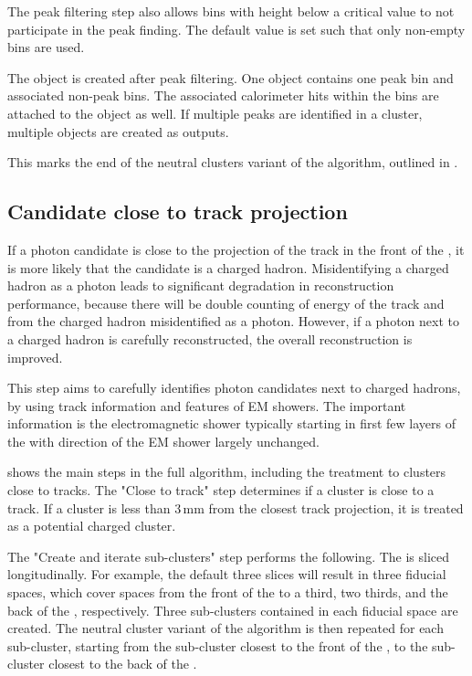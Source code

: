 The peak filtering step also allows bins with height below a critical value to not participate in the peak finding. The default value is set such that only non-empty bins are used.

The \ShowerPeak  object is created after peak filtering. One \ShowerPeak object contains one peak bin and associated non-peak bins. The associated calorimeter hits within the bins are attached to the \ShowerPeak object as well. If multiple peaks are identified in a cluster, multiple \ShowerPeak objects are created as outputs.

This marks the end of the neutral clusters variant of the \PhotonReconstruction algorithm, outlined in .


\subsection{Candidate close to track projection}
\label{sec:photon2Dtrack}
If  a photon candidate is close to the projection of the track in the front of the \ECAL, it is more likely that the candidate is a charged hadron. Misidentifying a charged hadron as a photon leads to significant degradation in reconstruction performance, because there will be double counting of energy of the track and from the charged hadron misidentified as a photon. However, if a photon next to a charged hadron is carefully reconstructed, the overall reconstruction is improved.

This step aims to carefully identifies photon candidates next to charged hadrons, by using track information and features of EM showers. The important information is the electromagnetic shower typically starting in first few layers of the \ECAL with direction of the EM shower largely unchanged.


 shows the main steps in the full \peakFinding algorithm, including the treatment to clusters close to tracks. The "Close to track" step determines if a cluster is close to a track. If a cluster is less than 3\,mm from the closest track projection, it is treated as a potential charged cluster.



The "Create and iterate sub-clusters" step performs the following. The \ECAL is sliced longitudinally. For example, the default three slices will result in three \ECAL fiducial spaces, which cover spaces from the front of the \ECAL to a third, two thirds, and the back of the \ECAL, respectively. Three sub-clusters contained in each fiducial space are created. The neutral cluster variant of the  \peakFinding algorithm is then repeated for each sub-cluster, starting from the sub-cluster closest to the front of the \ECAL, to the sub-cluster closest to the back of the \ECAL.

